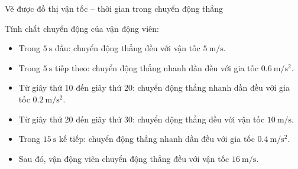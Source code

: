 \begin{dang}{Vẽ được đồ thị vận tốc – thời gian trong chuyển động thẳng}
{{\begin{center}
		\end{center}
	Tính chất chuyển động của vận động viên:
	\begin{itemize}
		\item Trong $\SI{5}{\second}$ đầu: chuyển động thẳng đều với vận tốc $\SI{5}{\meter/\second}$.
		\item Trong $\SI{5}{\second}$ tiếp theo: chuyển động thẳng nhanh dần đều với gia tốc $\SI{0.6}{\meter/\second^2}$.
		\item Từ giây thứ 10 đến giây thứ 20: chuyển động thẳng nhanh dần đều với gia tốc $\SI{0.2}{\meter/\second^2}$.
		\item Từ giây thứ 20 đến giây thứ 30: chuyển động thẳng đều với vận tốc $\SI{10}{\meter/\second}$.
		\item Trong $\SI{15}{\second}$ kế tiếp: chuyển động thẳng nhanh dần đều với gia tốc $\SI{0.4}{\meter/\second^2}$.
		\item Sau đó, vận động viên chuyển động thẳng đều với vận tốc $\SI{16}{\meter/\second}$.
		\end{itemize}
	}}
	
\end{dang}

